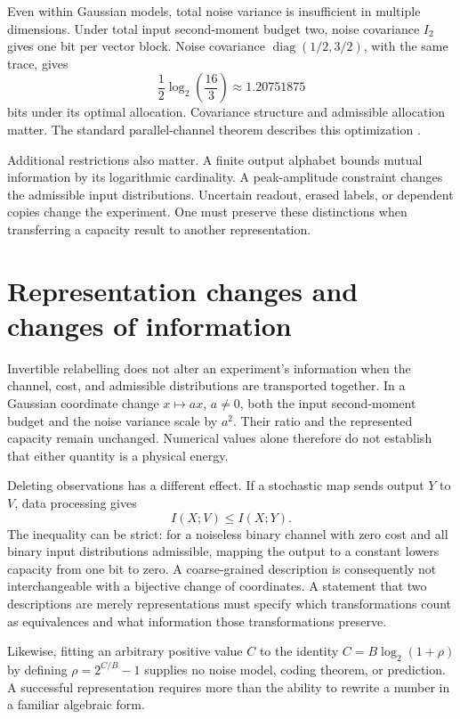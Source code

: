 \documentclass{article}
\begin{document}
Even within Gaussian models, total noise variance is insufficient in multiple dimensions. Under total input second-moment budget two, noise covariance \(I_2\) gives one bit per vector block. Noise covariance \(\operatorname{diag}(1/2,3/2)\), with the same trace, gives
\[
\frac12\log_2\!\left(\frac{16}{3}\right)
\approx1.20751875
\]
bits under its optimal allocation. Covariance structure and admissible allocation matter. The standard parallel-channel theorem describes this optimization \cite{polyanskiy17}.

Additional restrictions also matter. A finite output alphabet bounds mutual information by its logarithmic cardinality. A peak-amplitude constraint changes the admissible input distributions. Uncertain readout, erased labels, or dependent copies change the experiment. One must preserve these distinctions when transferring a capacity result to another representation.

\section{Representation changes and changes of information}
Invertible relabelling does not alter an experiment's information when the channel, cost, and admissible distributions are transported together. In a Gaussian coordinate change \(x\mapsto ax\), \(a\ne0\), both the input second-moment budget and the noise variance scale by \(a^2\). Their ratio and the represented capacity remain unchanged. Numerical values alone therefore do not establish that either quantity is a physical energy.

Deleting observations has a different effect. If a stochastic map sends output \(Y\) to \(V\), data processing gives
\[
I(X;V)\le I(X;Y).
\]
The inequality can be strict: for a noiseless binary channel with zero cost and all binary input distributions admissible, mapping the output to a constant lowers capacity from one bit to zero. A coarse-grained description is consequently not interchangeable with a bijective change of coordinates. A statement that two descriptions are merely representations must specify which transformations count as equivalences and what information those transformations preserve.

Likewise, fitting an arbitrary positive value \(C\) to the identity \(C=B\log_2(1+\rho)\) by defining \(\rho=2^{C/B}-1\) supplies no noise model, coding theorem, or prediction. A successful representation requires more than the ability to rewrite a number in a familiar algebraic form.
\end{document}
